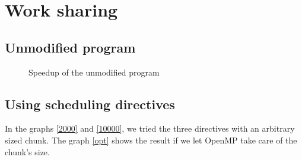 \chapter{Work sharing}

\section{Unmodified program}

\begin{figure}[!h]
  \begin{center}
  \end{center}
  \caption{Speedup of the unmodified program}
  \label{unmodif}
\end{figure}

\section{Using scheduling directives}

In the graphs \ref{2000} and \ref{10000}, we tried the three directives with an arbitrary sized chunk. The graph \ref{opt} shows the result if we let OpenMP take care of the chunk's size.

